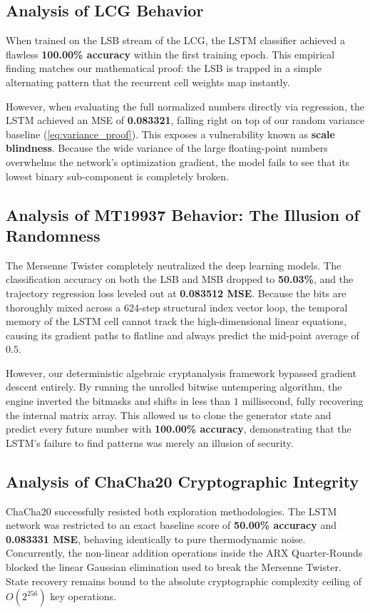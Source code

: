 \documentclass[twocolumn,10pt]{article}
\begin{document}
\subsection{Analysis of LCG Behavior}
When trained on the LSB stream of the LCG, the LSTM classifier achieved a flawless \textbf{100.00\% accuracy} within the first training epoch. This empirical finding matches our mathematical proof: the LSB is trapped in a simple alternating pattern that the recurrent cell weights map instantly. 

However, when evaluating the full normalized numbers directly via regression, the LSTM achieved an MSE of \textbf{0.083321}, falling right on top of our random variance baseline (\ref{eq:variance_proof}). This exposes a vulnerability known as \textbf{scale blindness}. Because the wide variance of the large floating-point numbers overwhelms the network's optimization gradient, the model fails to see that its lowest binary sub-component is completely broken.

\subsection{Analysis of MT19937 Behavior: The Illusion of Randomness}
The Mersenne Twister completely neutralized the deep learning models. The classification accuracy on both the LSB and MSB dropped to \textbf{50.03\%}, and the trajectory regression loss leveled out at \textbf{0.083512 MSE}. Because the bits are thoroughly mixed across a 624-step structural index vector loop, the temporal memory of the LSTM cell cannot track the high-dimensional linear equations, causing its gradient paths to flatline and always predict the mid-point average of $0.5$.

However, our deterministic algebraic cryptanalysis framework bypassed gradient descent entirely. By running the unrolled bitwise untempering algorithm, the engine inverted the bitmasks and shifts in less than $1$ millisecond, fully recovering the internal matrix array. This allowed us to clone the generator state and predict every future number with \textbf{100.00\% accuracy}, demonstrating that the LSTM's failure to find patterns was merely an illusion of security.

\subsection{Analysis of ChaCha20 Cryptographic Integrity}
ChaCha20 successfully resisted both exploration methodologies. The LSTM network was restricted to an exact baseline score of \textbf{50.00\% accuracy} and \textbf{0.083331 MSE}, behaving identically to pure thermodynamic noise. Concurrently, the non-linear addition operations inside the ARX Quarter-Rounds blocked the linear Gaussian elimination used to break the Mersenne Twister. State recovery remains bound to the absolute cryptographic complexity ceiling of $O(2^{256})$ key operations.
\end{document}
